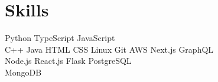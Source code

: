 \documentclass[]{openfont}
\begin{document}
\begin{minipage}[t]{0.33\textwidth}

\section{Skills}

Python \textbullet{} TypeScript \textbullet{} JavaScript\\ \textbullet{} C++ \textbullet{} Java  \textbullet{} HTML \textbullet{} CSS
Linux \textbullet{} Git \textbullet{} AWS \textbullet{} Next.js
\textbullet{} GraphQL \textbullet{}\\ Node.js  \textbullet{} React.js
\textbullet{}  Flask \textbullet{} PostgreSQL\\ 
\textbullet{} MongoDB  \\


\sectionsep




\end{minipage} 
\end{document}
